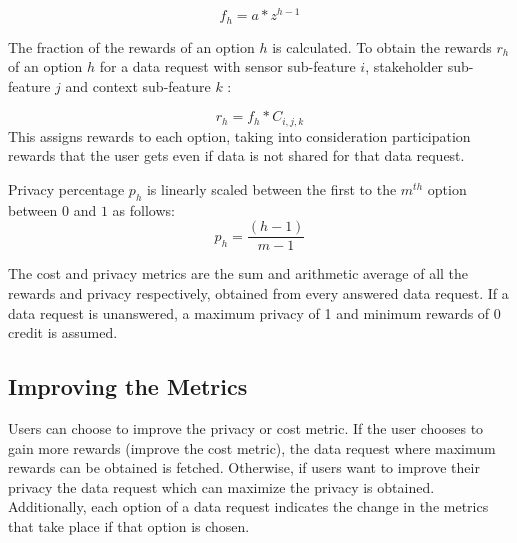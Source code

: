 \begin{equation}
f_{h} = a * z^{h-1}
\end{equation}

The fraction of the rewards of an option $h$ is calculated. To obtain the rewards $r_{h}$ of an option $h$ for a data request with sensor sub-feature $i$, stakeholder sub-feature $j$ and
context sub-feature $k$ :

\begin{equation}
r_{h} = f_{h} * C_{i,j,k}
\end{equation}
This assigns rewards to each option, taking into consideration participation rewards that the user gets even if data is not shared for that data request.

Privacy percentage $p_{h}$ is linearly scaled between the first to the $m^{th}$ option between $0$ and $1$ as follows:
\begin{equation}
p_{h} = \frac{(h-1)}{m-1}
\end{equation}

The cost and privacy metrics are the sum and arithmetic average of all the rewards and privacy respectively, obtained from every answered data request. If a data request is unanswered, a maximum privacy of 1 and minimum rewards of 0 credit is assumed.


\subsection{Improving the Metrics}
Users can choose to improve the privacy or cost metric. If the user chooses to gain more rewards (improve the cost metric), the data request where maximum rewards can be obtained is fetched. Otherwise, if users want to improve their privacy the data request which can maximize the privacy is obtained. Additionally, each option of a data request indicates the change in the metrics that take place if that option is chosen.

